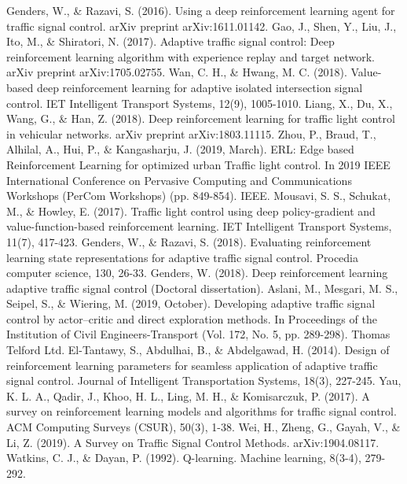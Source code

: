\documentclass[conference]{IEEEtran}
\begin{document}
\begin{thebibliography}{00}
 Genders, W., \& Razavi, S. (2016). Using a deep reinforcement learning agent for traffic signal control. arXiv preprint arXiv:1611.01142.
 Gao, J., Shen, Y., Liu, J., Ito, M., \& Shiratori, N. (2017). Adaptive traffic signal control: Deep reinforcement learning algorithm with experience replay and target network. arXiv preprint arXiv:1705.02755.
 Wan, C. H., \& Hwang, M. C. (2018). Value-based deep reinforcement learning for adaptive isolated intersection signal control. IET Intelligent Transport Systems, 12(9), 1005-1010.
 Liang, X., Du, X., Wang, G., \& Han, Z. (2018). Deep reinforcement learning for traffic light control in vehicular networks. arXiv preprint arXiv:1803.11115.
 Zhou, P., Braud, T., Alhilal, A., Hui, P., \& Kangasharju, J. (2019, March). ERL: Edge based Reinforcement Learning for optimized urban Traffic light control. In 2019 IEEE International Conference on Pervasive Computing and Communications Workshops (PerCom Workshops) (pp. 849-854). IEEE.
 Mousavi, S. S., Schukat, M., \& Howley, E. (2017). Traffic light control using deep policy-gradient and value-function-based reinforcement learning. IET Intelligent Transport Systems, 11(7), 417-423.
 Genders, W., \& Razavi, S. (2018). Evaluating reinforcement learning state representations for adaptive traffic signal control. Procedia computer science, 130, 26-33.
 Genders, W. (2018). Deep reinforcement learning adaptive traffic signal control (Doctoral dissertation).
 Aslani, M., Mesgari, M. S., Seipel, S., \& Wiering, M. (2019, October). Developing adaptive traffic signal control by actor–critic and direct exploration methods. In Proceedings of the Institution of Civil Engineers-Transport (Vol. 172, No. 5, pp. 289-298). Thomas Telford Ltd.
 El-Tantawy, S., Abdulhai, B., \& Abdelgawad, H. (2014). Design of reinforcement learning parameters for seamless application of adaptive traffic signal control. Journal of Intelligent Transportation Systems, 18(3), 227-245.
 Yau, K. L. A., Qadir, J., Khoo, H. L., Ling, M. H., \& Komisarczuk, P. (2017). A survey on reinforcement learning models and algorithms for traffic signal control. ACM Computing Surveys (CSUR), 50(3), 1-38.
 Wei, H., Zheng, G., Gayah, V., \& Li, Z. (2019). A Survey on Traffic Signal Control Methods. arXiv:1904.08117.
 Watkins, C. J., \& Dayan, P. (1992). Q-learning. Machine learning, 8(3-4), 279-292.

\end{thebibliography}
\end{document}
